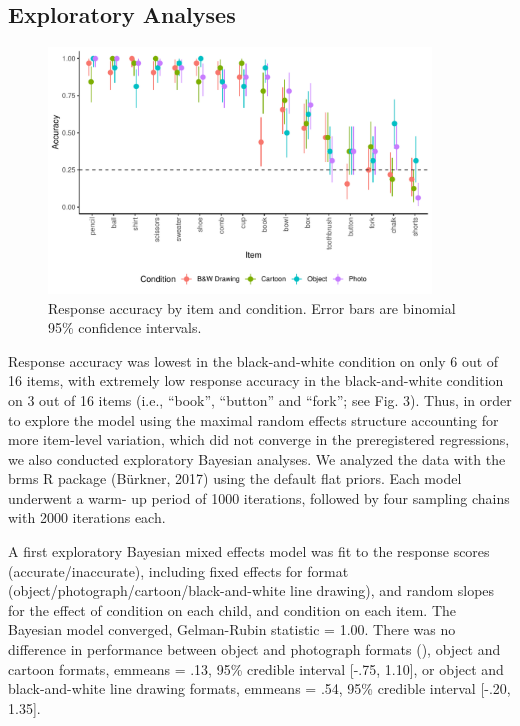\documentclass[10pt, letterpaper]{article}
\begin{document}
\subsection{Exploratory Analyses}\label{exploratory-analyses}

\begin{CodeChunk}
\begin{figure}[tb]

{\centering \includegraphics[width=4in]{figs/fig3-1} 

}

\caption[Response accuracy by item and condition]{Response accuracy by item and condition. Error bars are binomial 95\% confidence intervals.}\label{fig:fig3}
\end{figure}
\end{CodeChunk}

Response accuracy was lowest in the black-and-white condition on only 6
out of 16 items, with extremely low response accuracy in the
black-and-white condition on 3 out of 16 items (i.e., ``book'',
``button'' and ``fork''; see Fig. 3). Thus, in order to explore the
model using the maximal random effects structure accounting for more
item-level variation, which did not converge in the preregistered
regressions, we also conducted exploratory Bayesian analyses. We
analyzed the data with the brms R package (Bürkner, 2017) using the
default flat priors. Each model underwent a warm- up period of 1000
iterations, followed by four sampling chains with 2000 iterations each.

A first exploratory Bayesian mixed effects model was fit to the response
scores (accurate/inaccurate), including fixed effects for format
(object/photograph/cartoon/black-and-white line drawing), and random
slopes for the effect of condition on each child, and condition on each
item. The Bayesian model converged, Gelman-Rubin statistic = 1.00. There
was no difference in performance between object and photograph formats
(), object and cartoon formats, emmeans = .13, 95\% credible interval
{[}-.75, 1.10{]}, or object and black-and-white line drawing formats,
emmeans = .54, 95\% credible interval {[}-.20, 1.35{]}.
\end{document}
